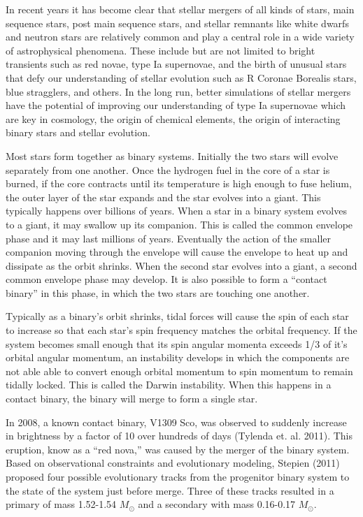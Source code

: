 \documentclass{article}
\begin{document}
In recent years it has become clear that stellar mergers of all kinds of stars, main sequence stars, post main sequence stars, and stellar remnants like white dwarfs and neutron stars are relatively common and play a central role in a wide variety of astrophysical phenomena. These include but are not limited to bright transients such as red novae, type Ia supernovae, and the birth of unusual stars that defy our understanding of stellar evolution such as R Coronae Borealis stars, blue stragglers, and others. In the long run, better simulations of stellar mergers have the potential of improving our understanding of type Ia supernovae which are key in cosmology, the origin of chemical elements, the origin of interacting binary stars and stellar evolution.

Most stars form together as binary systems. Initially the two stars will evolve separately from one another. Once the hydrogen fuel in the core of a star is burned, if the core contracts until its temperature is high enough to fuse helium, the outer layer of the star expands and the star evolves into a giant. This typically happens over billions of years. When a star in a binary system evolves to a giant, it may swallow up its companion. This is called the common envelope phase and it may last millions of years. Eventually the action of the smaller companion moving through the envelope will cause the envelope to heat up and dissipate as the orbit shrinks. When the second star evolves into a giant, a second common envelope phase may develop. It is also possible to form a “contact binary” in this phase, in which the two stars are touching one another. 

Typically as a binary’s orbit shrinks, tidal forces will cause the spin of each star to increase so that each star’s spin frequency matches the orbital frequency. If the system becomes small enough that its spin angular momenta exceeds 1/3 of it’s orbital angular momentum, an instability develops in which the components are not able able to convert enough orbital momentum to spin momentum to remain tidally locked. This is called the Darwin instability. When this happens in a contact binary, the binary will merge to form a single star.

In 2008, a known contact binary, V1309 Sco, was observed to suddenly increase in brightness by a factor of 10 over hundreds of days (Tylenda et. al. 2011). This eruption, know as a “red nova,” was caused by the merger of the binary system. Based on observational constraints and evolutionary modeling, Stepien (2011) proposed four possible evolutionary tracks from the progenitor binary system to the state of the system just before merge. Three of these tracks resulted in a primary of mass 1.52-1.54 $M_\odot$  and a secondary with mass 0.16-0.17 $M_\odot$.
\end{document}
